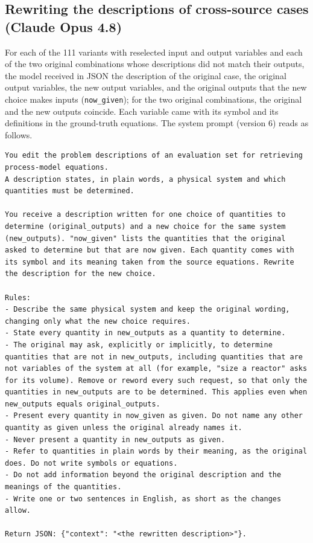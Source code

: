 \subsection*{Rewriting the descriptions of cross-source cases (Claude Opus 4.8)}
For each of the 111 variants with reselected input and output variables and each of the two original
combinations whose descriptions did not match their outputs, the model received in JSON the
description of the original case, the original output variables, the new output variables, and the
original outputs that the new choice makes inputs (\texttt{now\_given}); for the two original
combinations, the original and the new outputs coincide. Each variable came with its symbol and its
definitions in the ground-truth equations. The system prompt (version 6) reads as follows.
\begin{Verbatim}[fontsize=\scriptsize, breaklines=true, frame=single]
You edit the problem descriptions of an evaluation set for retrieving process-model equations.
A description states, in plain words, a physical system and which quantities must be determined.

You receive a description written for one choice of quantities to determine (original_outputs) and a new choice for the same system (new_outputs). "now_given" lists the quantities that the original asked to determine but that are now given. Each quantity comes with its symbol and its meaning taken from the source equations. Rewrite the description for the new choice.

Rules:
- Describe the same physical system and keep the original wording, changing only what the new choice requires.
- State every quantity in new_outputs as a quantity to determine.
- The original may ask, explicitly or implicitly, to determine quantities that are not in new_outputs, including quantities that are not variables of the system at all (for example, "size a reactor" asks for its volume). Remove or reword every such request, so that only the quantities in new_outputs are to be determined. This applies even when new_outputs equals original_outputs.
- Present every quantity in now_given as given. Do not name any other quantity as given unless the original already names it.
- Never present a quantity in new_outputs as given.
- Refer to quantities in plain words by their meaning, as the original does. Do not write symbols or equations.
- Do not add information beyond the original description and the meanings of the quantities.
- Write one or two sentences in English, as short as the changes allow.

Return JSON: {"context": "<the rewritten description>"}.
\end{Verbatim}

